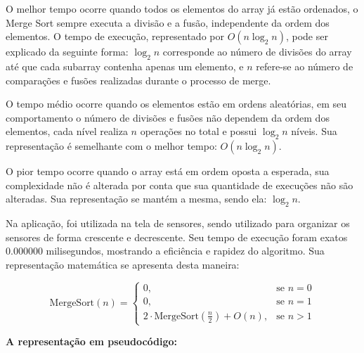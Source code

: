 O melhor tempo ocorre quando todos os elementos do array já estão ordenados, o Merge Sort sempre executa a divisão e a fusão, independente  da ordem dos elementos. O tempo de execução, representado por \( O(n \log_2 n) \), pode ser explicado da seguinte forma: \( \log_2 n \) corresponde ao número de divisões do array até que cada subarray contenha apenas um elemento, e \( n \) refere-se ao número de comparações e fusões realizadas durante o processo de merge.

O tempo médio ocorre quando os elementos estão em ordens aleatórias, em seu comportamento o número de divisões e fusões não dependem da ordem dos elementos, cada nível realiza \( n \) operações no total e possui \( \log_2 n \) níveis. Sua representação é semelhante com o melhor tempo: \( O(n \log_2 n) \).

O pior tempo ocorre quando o array está em ordem oposta a esperada, sua complexidade não é alterada por conta que sua quantidade de execuções não são alteradas. Sua representação se mantém a mesma, sendo ela: \( \log_2 n \).

Na aplicação, foi utilizada na tela de sensores, sendo utilizado para organizar os sensores de forma crescente e decrescente. Seu tempo de execução foram exatos 0.000000 milisegundos, mostrando a eficiência e rapidez do algoritmo. Sua representação matemática se apresenta desta maneira:

\[
\text{MergeSort}(n) =
\begin{cases}
0, & \text{se } n = 0 \\
0, & \text{se } n = 1 \\
2 \cdot \text{MergeSort}\left(\frac{n}{2}\right) + O(n), & \text{se } n > 1
\end{cases}
\]


\textbf {A representação em pseudocódigo:} 


